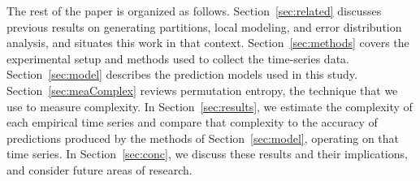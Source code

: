 \documentclass[%
pre,
reprint,
superscriptaddress,
showpacs,
nofootinbib,
nobibnotes,
 amsmath,amssymb,
 aps,
]{revtex4-1}
\begin{document}


The rest of the paper is organized as follows.
Section~\ref{sec:related} discusses previous results on generating
partitions, local modeling, and error distribution analysis, and
situates this work in that context. Section~\ref{sec:methods} covers
the experimental setup and methods used to collect the time-series
data. Section~\ref{sec:model} describes the prediction models used in
this study.  Section~\ref{sec:meaComplex} reviews permutation entropy,
the technique that we use to measure complexity.  In
Section~\ref{sec:results}, we estimate the complexity of each
empirical time series and compare that complexity to the accuracy of
predictions produced by the methods of Section~\ref{sec:model},
operating on that time series.  In Section~\ref{sec:conc}, we discuss
these results and their implications, and consider future areas of
research.
\end{document}
